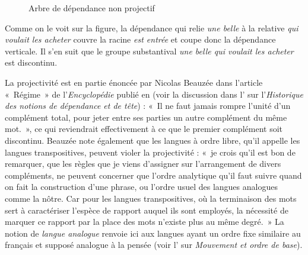 \begin{figure}
\caption{\label{fig:nonproj-belle}Arbre de dépendance non projectif}
\end{figure}



Comme on le voit sur la figure, la dépendance qui relie \textit{une belle} à la relative \textit{qui voulait les acheter} couvre la racine \textit{est entrée} et coupe donc la dépendance verticale. Il s’en suit que le groupe substantival \textit{une belle qui voulait les acheter} est discontinu.

La projectivité est en partie énoncée par Nicolas Beauzée dans l’article «~Régime~» de l’\textit{Encyclopédie} publié en \citeyear{Beauzée1765} (voir la discussion dans l’ sur l'\textit{Historique des notions de dépendance et de tête}) : «~Il ne faut jamais rompre l’unité d’un complément total, pour jeter entre ses parties un autre complément du même mot.~», ce qui reviendrait effectivement à ce que le premier complément soit discontinu. Beauzée note également que les langues à ordre libre, qu'il appelle les langues transpositives, peuvent violer la projectivité : «~je crois qu’il est bon de remarquer, que les règles que je viens d’assigner sur l’arrangement de divers compléments, ne peuvent concerner que l’ordre analytique qu’il faut suivre quand on fait la construction d’une phrase, ou l’ordre usuel des langues analogues comme la nôtre. Car pour les langues transpositives, où la terminaison des mots sert à caractériser l’espèce de rapport auquel ils sont employés, la nécessité de marquer ce rapport par la place des mots n’existe plus au même degré.~» La notion de \textit{langue analogue} renvoie ici aux langues ayant un ordre fixe similaire au français et supposé analogue à la pensée (voir l’ sur \textit{Mouvement et ordre de base}).\largerpage


